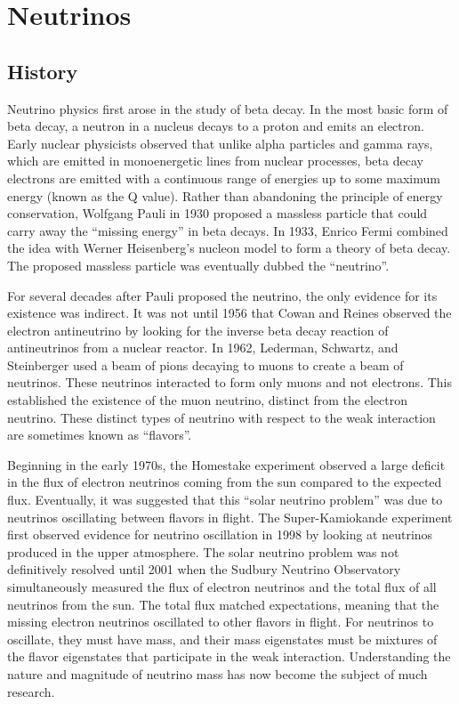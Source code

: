 \documentclass[herrin-thesis.tex]{subfiles}
\begin{document}
\chapter{Neutrinos}
\label{ch:neutrinos}

\section{History}
Neutrino physics first arose in the study of beta decay. In the most basic form of beta decay, a neutron in a nucleus decays to a proton and emits an electron. Early nuclear physicists observed that unlike alpha particles and gamma rays, which are emitted in monoenergetic lines from nuclear processes, beta decay electrons are emitted with a continuous range of energies up to some maximum energy (known as the Q value). Rather than abandoning the principle of energy conservation, Wolfgang Pauli in 1930 proposed a massless particle that could carry away the ``missing energy'' in beta decays. In 1933, Enrico Fermi \cite{Fermi:1934bh} combined the idea with Werner Heisenberg's nucleon model to form a theory of beta decay. The proposed massless particle was eventually dubbed the ``neutrino''.

For several decades after Pauli proposed the neutrino, the only evidence for its existence was indirect. It was not until 1956 that Cowan and Reines \cite{Cowan:1956qf} observed the electron antineutrino by looking for the inverse beta decay reaction of antineutrinos from a nuclear reactor. In 1962, Lederman, Schwartz, and Steinberger \cite{Danby:1962ve} used a beam of pions decaying to muons to create a beam of neutrinos. These neutrinos interacted to form only muons and not electrons. This established the existence of the muon neutrino, distinct from the electron neutrino. These distinct types of neutrino with respect to the weak interaction are sometimes known as ``flavors''.

Beginning in the early 1970s, the Homestake experiment \cite{Cleveland:1998ly} observed a large deficit in the flux of electron neutrinos coming from the sun compared to the expected flux. Eventually, it was suggested that this ``solar neutrino problem'' was due to neutrinos oscillating between flavors in flight. The Super-Kamiokande experiment first observed evidence for neutrino oscillation in 1998 \cite{Fukuda:1998zr} by looking at neutrinos produced in the upper atmosphere. The solar neutrino problem was not definitively resolved until 2001 when the Sudbury Neutrino Observatory \cite{Ahmad:2001ys} simultaneously measured the flux of electron neutrinos and the total flux of all neutrinos from the sun. The total flux matched expectations, meaning that the missing electron neutrinos oscillated to other flavors in flight. For neutrinos to oscillate, they must have mass, and their mass eigenstates must be mixtures of the flavor eigenstates that participate in the weak interaction. Understanding the nature and magnitude of neutrino mass has now become the subject of much research.
\end{document}
